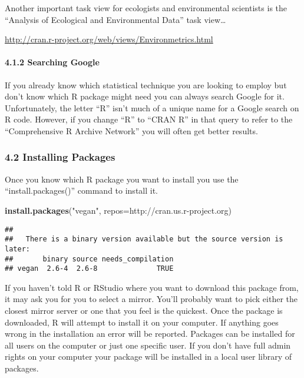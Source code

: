 \documentclass[
]{article}
\newenvironment{Shaded}{\begin{snugshade}}{\end{snugshade}}
\newcommand{\AttributeTok}[1]{\textcolor[rgb]{0.13,0.29,0.53}{#1}}
\newcommand{\FunctionTok}[1]{\textcolor[rgb]{0.13,0.29,0.53}{\textbf{#1}}}
\newcommand{\NormalTok}[1]{#1}
\newcommand{\StringTok}[1]{\textcolor[rgb]{0.31,0.60,0.02}{#1}}
\begin{document}
Another important task view for ecologists and environmental scientists
is the ``Analysis of Ecological and Environmental Data'' task
view\ldots{}

\url{http://cran.r-project.org/web/views/Environmetrics.html}

\paragraph{4.1.2 Searching Google}\label{searching-google}

If you already know which statistical technique you are looking to
employ but don't know which R package might need you can always search
Google for it. Unfortunately, the letter ``R'' isn't much of a unique
name for a Google search on R code. However, if you change ``R'' to
``CRAN R'' in that query to refer to the ``Comprehensive R Archive
Network'' you will often get better results.

\subsubsection{4.2 Installing Packages}\label{installing-packages}

Once you know which R package you want to install you use the
``install.packages()'' command to install it.

\begin{Shaded}
\begin{Highlighting}[]
\FunctionTok{install.packages}\NormalTok{(}\StringTok{"vegan"}\NormalTok{, }\AttributeTok{repos=}\StringTok{\textquotesingle{}http://cran.us.r{-}project.org\textquotesingle{}}\NormalTok{)}
\end{Highlighting}
\end{Shaded}

\begin{verbatim}
## 
##   There is a binary version available but the source version is later:
##       binary source needs_compilation
## vegan  2.6-4  2.6-8              TRUE
\end{verbatim}

If you haven't told R or RStudio where you want to download this package
from, it may ask you for you to select a mirror. You'll probably want to
pick either the closest mirror server or one that you feel is the
quickest. Once the package is downloaded, R will attempt to install it
on your computer. If anything goes wrong in the installation an error
will be reported. Packages can be installed for all users on the
computer or just one specific user. If you don't have full admin rights
on your computer your package will be installed in a local user library
of packages.
\end{document}
